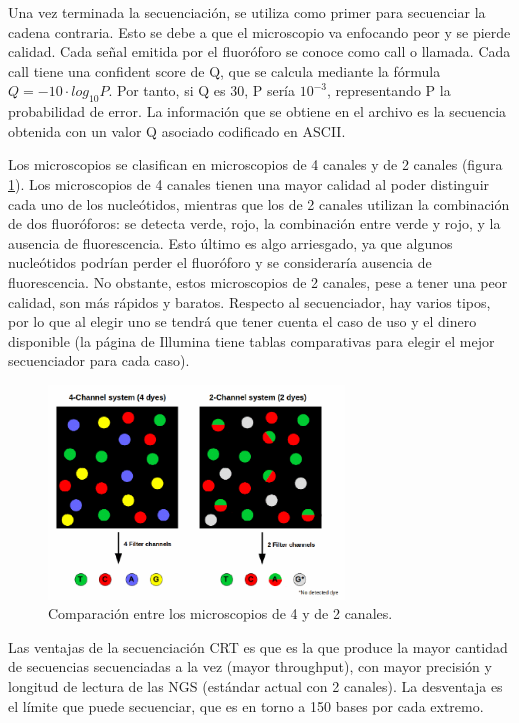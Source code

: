 \begin{itemize}
\begin{itemize}
Una vez terminada la secuenciación, se utiliza como primer para secuenciar la cadena contraria. Esto se debe a que el microscopio va enfocando peor y se pierde calidad. Cada señal emitida por el fluoróforo se conoce como call o llamada. Cada call tiene una confident score de Q, que se calcula mediante la fórmula $Q = - 10 \cdot log_{10} P $. Por tanto, si Q es 30, P sería $10^{-3}$, representando P la probabilidad de error. La información que se obtiene en el archivo es la secuencia obtenida con un valor Q asociado codificado en ASCII. 

Los microscopios se clasifican en microscopios de 4 canales y de 2 canales (figura \ref{fig:microscope-channel}). Los microscopios de 4 canales tienen una mayor calidad al poder distinguir cada uno de los nucleótidos, mientras que los de 2 canales utilizan la combinación de dos fluoróforos: se detecta verde, rojo, la combinación entre verde y rojo, y la ausencia de fluorescencia. Esto último es algo arriesgado, ya que algunos nucleótidos podrían perder el fluoróforo y se consideraría ausencia de fluorescencia. No obstante, estos microscopios de 2 canales, pese a tener una peor calidad, son más rápidos y baratos. Respecto al secuenciador, hay varios tipos, por lo que al elegir uno se tendrá que tener cuenta el caso de uso y el dinero disponible (la página de Illumina tiene tablas comparativas para elegir el mejor secuenciador para cada caso). 

\begin{figure}[htbp]
\centering
\includegraphics[width = 0.7\textwidth]{figs/microscope-channels.png}
\caption{Comparación entre los microscopios de 4 y de 2 canales.}
\label{fig:microscope-channel}
\end{figure}

Las ventajas de la secuenciación CRT es que es la que produce la mayor cantidad de secuencias secuenciadas a la vez (mayor throughput), con mayor precisión y longitud de lectura de las NGS (estándar actual con 2 canales). La desventaja es el límite que puede secuenciar, que es en torno a 150 bases por cada extremo. 


\end{itemize}
\end{itemize}
